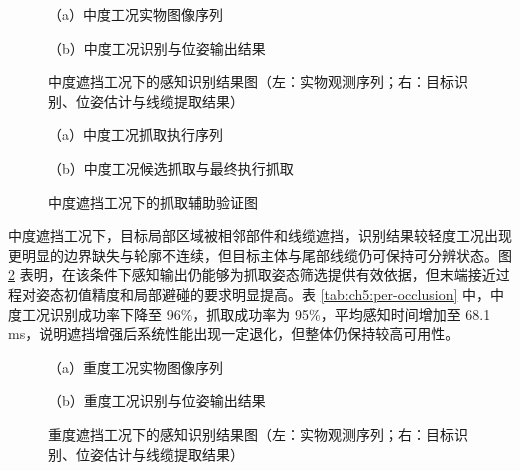 \begin{figure}[htbp]
  \centering
  \begin{minipage}[t]{0.48\textwidth}
    \centering
    
    {\small （a）中度工况实物图像序列}
  \end{minipage}
  \hfill
  \begin{minipage}[t]{0.48\textwidth}
    \centering
    
    {\small （b）中度工况识别与位姿输出结果}
  \end{minipage}
  \caption{中度遮挡工况下的感知识别结果图（左：实物观测序列；右：目标识别、位姿估计与线缆提取结果）}
  \label{fig:ch5:occ-medium}
\end{figure}

\begin{figure}[htbp]
  \centering
  \begin{minipage}[t]{0.48\textwidth}
    \centering
    
    {\small （a）中度工况抓取执行序列}
  \end{minipage}
  \hfill
  \begin{minipage}[t]{0.48\textwidth}
    \centering
    
    {\small （b）中度工况候选抓取与最终执行抓取}
  \end{minipage}
  \caption{中度遮挡工况下的抓取辅助验证图}
  \label{fig:ch5:grasp-medium}
\end{figure}

\noindent
中度遮挡工况下，目标局部区域被相邻部件和线缆遮挡，识别结果较轻度工况出现更明显的边界缺失与轮廓不连续，但目标主体与尾部线缆仍可保持可分辨状态。图 \ref{fig:ch5:grasp-medium} 表明，在该条件下感知输出仍能够为抓取姿态筛选提供有效依据，但末端接近过程对姿态初值精度和局部避碰的要求明显提高。表 \ref{tab:ch5:per-occlusion} 中，中度工况识别成功率下降至 96\%，抓取成功率为 95\%，平均感知时间增加至 68.1\,ms，说明遮挡增强后系统性能出现一定退化，但整体仍保持较高可用性。

\begin{figure}[htbp]
  \centering
  \begin{minipage}[t]{0.48\textwidth}
    \centering
    
    {\small （a）重度工况实物图像序列}
  \end{minipage}
  \hfill
  \begin{minipage}[t]{0.48\textwidth}
    \centering
    
    {\small （b）重度工况识别与位姿输出结果}
  \end{minipage}
  \caption{重度遮挡工况下的感知识别结果图（左：实物观测序列；右：目标识别、位姿估计与线缆提取结果）}
  \label{fig:ch5:occ-heavy}
\end{figure}


